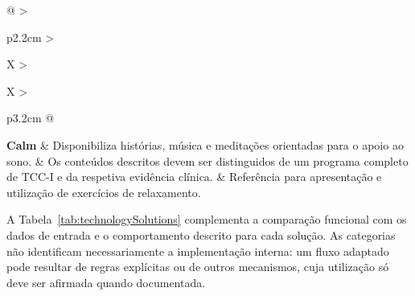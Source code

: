\begin{xltabular}{\textwidth}{@{} 
		>{\raggedright\arraybackslash}p{2.2cm} 
		>{\raggedright\arraybackslash}X 
		>{\raggedright\arraybackslash}X 
		>{\raggedright\arraybackslash}p{3.2cm} @{}}
	\textbf{Calm} & Disponibiliza histórias, música e meditações orientadas para o apoio ao sono. & Os conteúdos descritos devem ser distinguidos de um programa completo de TCC-I e da respetiva evidência clínica. & Referência para apresentação e utilização de exercícios de relaxamento. \\ 
	
\end{xltabular}



A Tabela~\ref{tab:technologySolutions} complementa a comparação funcional com os dados de entrada e o comportamento descrito para cada solução. As categorias não identificam necessariamente a implementação interna: um fluxo adaptado pode resultar de regras explícitas ou de outros mecanismos, cuja utilização só deve ser afirmada quando documentada.

